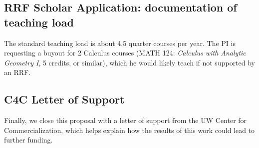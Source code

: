 \documentclass[11pt]{article}
\begin{document}
\subsection{RRF Scholar Application: documentation of teaching load}
The standard teaching load is about 4.5 quarter courses per year.  The
PI is requesting a buyout for 2 Calculus courses (MATH 124: {\em
  Calculus with Analytic Geometry I}, 5 credits, or similar), which he
would likely teach if not supported by an RRF.

\subsection{C4C Letter of Support}\label{sec:letter}
Finally, we close this proposal with a letter of support from the UW
Center for Commercialization, which helps explain how the results of
this work could lead to further funding.


\end{document}
